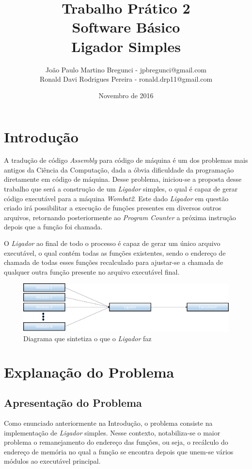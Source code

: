 \documentclass{article}
\title{Trabalho Prático 2 \\ Software Básico
\\ Ligador Simples}
\author{João Paulo Martino Bregunci - jpbregunci@gmail.com
\\ Ronald Davi Rodrigues Pereira - ronald.drp11@gmail.com}
\date{Novembro de 2016}
\begin{document}
\maketitle


\section{Introdução}
A tradução de código \textit{Assembly} para código de máquina é um dos problemas mais antigos da Ciência da Computação, dada a óbvia dificuldade da programação diretamente em código de máquina. Desse problema, iniciou-se a proposta desse trabalho que será a construção de um \textit{Ligador} simples, o qual é capaz de gerar código executável para a máquina \textit{Wombat2}. Este dado \textit{Ligador} em questão criado irá possibilitar a execução de funções presentes em diversos outros arquivos, retornando posteriormente ao \textit{Program Counter} a próxima instrução depois que a função foi chamada.

O \textit{Ligador} ao final de todo o processo é capaz de gerar um único arquivo executável, o qual contém todas as funções existentes, sendo o endereço de chamada de todas esses funções recalculado para ajustar-se a chamada de qualquer outra função presente no arquivo executável final.


\begin{figure}[!h]
\centering
\includegraphics[scale=0.4]{ImagemTP2.png}
\caption{Diagrama que sintetiza o que o \textit{Ligador} faz}
\label{fig:trieExample}
\end{figure}

\section{Explanação do Problema}
\subsection{Apresentação do Problema}
Como enunciado anteriormente na Introdução, o problema consiste na implementação de \textit{Ligador} simples. Nesse contexto, notabiliza-se o maior problema o remanejamento do endereço das funções, ou seja, o recálculo do endereço de memória no qual a função se encontra depois que unem-se vários módulos ao executável principal.
\end{document}
